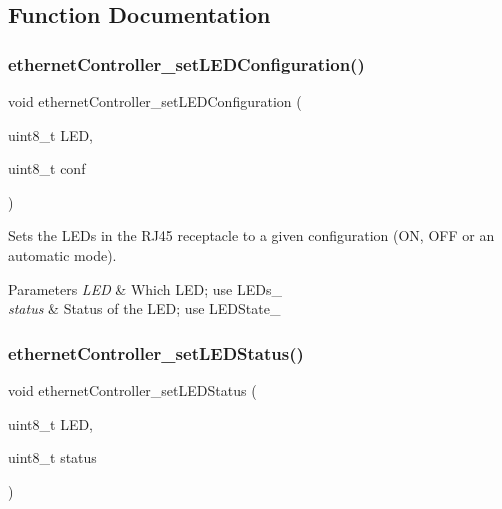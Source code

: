 \subsection{Function Documentation}
\mbox{\label{group__leds_ga3ec0343a266cb8a4925097d708dd96f4}} 
\subsubsection{\texorpdfstring{ethernetController\_setLEDConfiguration()}{ethernetController\_setLEDConfiguration()}}
{\footnotesize\ttfamily void ethernet\+Controller\+\_\+set\+L\+E\+D\+Configuration (\begin{DoxyParamCaption}\item[{uint8\+\_\+t}]{L\+ED,  }\item[{uint8\+\_\+t}]{conf }\end{DoxyParamCaption})}



Sets the L\+E\+Ds in the R\+J45 receptacle to a given configuration (ON, O\+FF or an \textquotesingle{}automatic\textquotesingle{} mode). 


\begin{DoxyParams}{Parameters}
{\em L\+ED} & Which L\+ED; use L\+E\+Ds\+\_\+ \\
\hline
{\em status} & Status of the L\+ED; use L\+E\+D\+State\+\_\+ \\
\hline
\end{DoxyParams}
\mbox{\label{group__leds_ga88905c196e37262340f8404fcb61ecf9}} 
\subsubsection{\texorpdfstring{ethernetController\_setLEDStatus()}{ethernetController\_setLEDStatus()}}
{\footnotesize\ttfamily void ethernet\+Controller\+\_\+set\+L\+E\+D\+Status (\begin{DoxyParamCaption}\item[{uint8\+\_\+t}]{L\+ED,  }\item[{uint8\+\_\+t}]{status }\end{DoxyParamCaption})}




